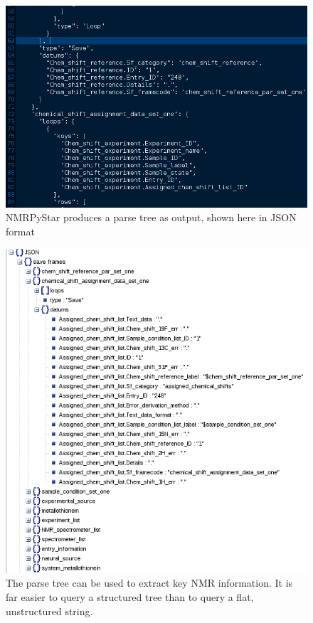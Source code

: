 \begin{figure}
  \includegraphics[scale=0.5]{figures/nmrpystar_json}
  \caption[NMRPyStar produces a parse tree as output]
          {NMRPyStar produces a parse tree as output, shown here in JSON format}
  \label{nmrpystar_json}
\end{figure}

\begin{figure}
  \includegraphics[scale=0.5]{figures/nmrpystar_structure}
  \caption[The parse tree can be used to extract key NMR information]
          {The parse tree can be used to extract key NMR information.
           It is far easier to query a structured tree than to query
           a flat, unstructured string.}
  \label{nmrpystar_structure}
\end{figure}

